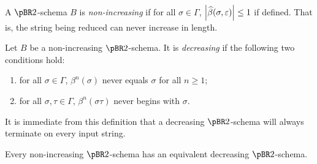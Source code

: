 \documentclass{llncs}
\begin{document}
\begin{definition}

    A $\pBR2$-schema $B$ is \emph{non-increasing} if for all $\sigma\in\Gamma$,
    $\left|\widehat\beta(\sigma,\varepsilon)\right|\leq1$ if defined.
    That is, the string being reduced can never increase in length.

\end{definition}

\begin{definition}

    Let $B$ be a non-increasing $\pBR2$-schema.
    It is \emph{decreasing} if the following two conditions hold:
    \begin{enumerate}
        \item for all $\sigma\in\Gamma$, $\beta^n(\sigma)$ never equals $\sigma$ for all $n\geq1$;
        \item for all $\sigma,\tau\in\Gamma$, $\beta^n(\sigma\tau)$ never begins with $\sigma$.
    \end{enumerate}

\end{definition}

It is immediate from this definition that a decreasing $\pBR2$-schema will always terminate on every input
string.

\begin{lemma}

    Every non-increasing $\pBR2$-schema has an equivalent decreasing $\pBR2$-schema.

\end{lemma}
\end{document}
